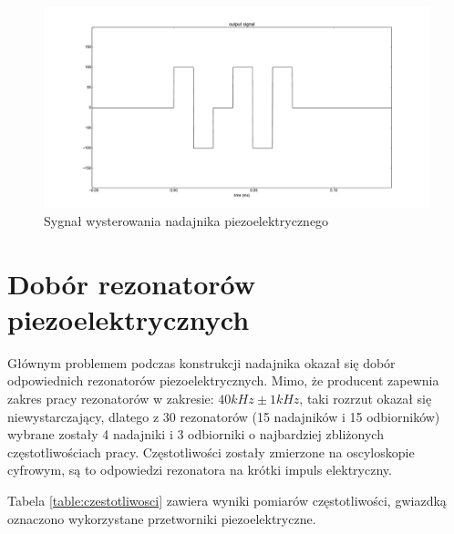  \begin{figure}[h!]
    \centering
    \includegraphics[width=1.15\textwidth, trim= 47mm 0mm 0mm 0mm,clip]{output_signal}
    \caption{Sygnał wysterowania nadajnika piezoelektrycznego}
    \label{fig:output_signal}
\end{figure}

\newpage

\section{Dobór rezonatorów piezoelektrycznych}

Głównym problemem podczas konstrukcji nadajnika okazał się dobór odpowiednich rezonatorów piezoelektrycznych.
Mimo, że producent zapewnia zakres pracy rezonatorów w zakresie: $40 kHz \pm 1kHz$, taki rozrzut okazał się niewystarczający, 
dlatego z 30 rezonatorów (15 nadajników i 15 odbiorników) wybrane zostały 4 nadajniki i 3 odbiorniki o najbardziej 
zbliżonych częstotliwościach pracy. Częstotliwości zostały zmierzone na oscyloskopie cyfrowym, są to odpowiedzi 
rezonatora na krótki impuls elektryczny.

Tabela \ref{table:czestotliwosci} zawiera wyniki pomiarów częstotliwości, gwiazdką oznaczono wykorzystane przetworniki piezoelektryczne.


